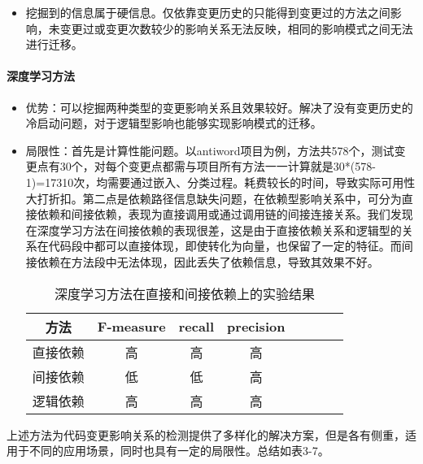 \begin{itemize}
\begin{itemize}
        \item 挖掘到的信息属于硬信息。仅依靠变更历史的只能得到变更过的方法之间影响，未变更过或变更次数较少的影响关系无法反映，相同的影响模式之间无法进行迁移。
        \end{itemize}
    
\end{itemize}



\paragraph{深度学习方法}

\begin{itemize}

    \item 优势：可以挖掘两种类型的变更影响关系且效果较好。解决了没有变更历史的冷启动问题，对于逻辑型影响也能够实现影响模式的迁移。

    \item 局限性：首先是计算性能问题。以antiword项目为例，方法共578个，测试变更点有30个，对每个变更点都需与项目所有方法一一计算就是30*(578-1)=17310次，均需要通过嵌入、分类过程。耗费较长的时间，导致实际可用性大打折扣。第二点是依赖路径信息缺失问题，在依赖型影响关系中，可分为直接依赖和间接依赖，表现为直接调用或通过调用链的间接连接关系。我们发现在深度学习方法在间接依赖的表现很差，这是由于直接依赖关系和逻辑型的关系在代码段中都可以直接体现，即使转化为向量，也保留了一定的特征。而间接依赖在方法段中无法体现，因此丢失了依赖信息，导致其效果不好。
    

    \begin{table}[htbp]
    \caption{深度学习方法在直接和间接依赖上的实验结果}
    \vspace{0.5em}\centering\wuhao
    \begin{tabular}{cccccccc}
    \toprule
    方法 & F-measure & recall & precision  \\
    \midrule
    直接依赖 & 高 & 高 & 高  \\
    间接依赖 & 低 & 低 & 高  \\
    逻辑依赖 & 高 & 高 & 高\\
    \bottomrule
    \end{tabular}
    \end{table}
    
\end{itemize}
    

上述方法为代码变更影响关系的检测提供了多样化的解决方案，但是各有侧重，适用于不同的应用场景，同时也具有一定的局限性。总结如表3-7。


